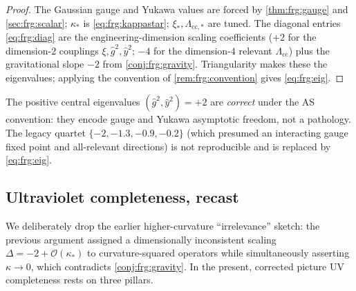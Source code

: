 \begin{proof}
The Gaussian gauge and Yukawa values are forced by \autoref{thm:frg:gauge}
and \autoref{sec:frg:scalar}; $\kappa_{\ast}$ is \eqref{eq:frg:kappastar};
$\xi_{\ast},\Lambda_{\mathrm{cc},\ast}$ are tuned. The diagonal entries
\eqref{eq:frg:diag} are the engineering-dimension scaling coefficients
($+2$ for the dimension-$2$ couplings $\xi,\hat g^{2},\hat y^{2}$; $-4$ for
the dimension-$4$ relevant $\Lambda_{\mathrm{cc}}$) plus the gravitational
slope $-2$ from \autoref{conj:frg:gravity}. Triangularity makes these the
eigenvalues; applying the convention of \autoref{rem:frg:convention} gives
\eqref{eq:frg:eig}.
\end{proof}

\begin{remark}
The positive central eigenvalues $(\hat g^{2},\hat y^{2})=+2$ are
\emph{correct} under the AS convention: they encode gauge and Yukawa
asymptotic freedom, not a pathology. The legacy quartet
$\{-2,-1.3,-0.9,-0.2\}$ (which presumed an interacting gauge fixed point
and all-relevant directions) is not reproducible and is replaced by
\eqref{eq:frg:eig}.
\end{remark}

\subsection{Ultraviolet completeness, recast}
\label{sec:frg:uvcomplete}

We deliberately drop the earlier higher-curvature ``irrelevance'' sketch:
the previous argument assigned a dimensionally inconsistent scaling
$\Delta=-2+\mathcal{O}(\kappa_{\ast})$ to curvature-squared operators while
simultaneously asserting $\kappa\to0$, which contradicts
\autoref{conj:frg:gravity}. In the present, corrected picture UV
completeness rests on three pillars.

